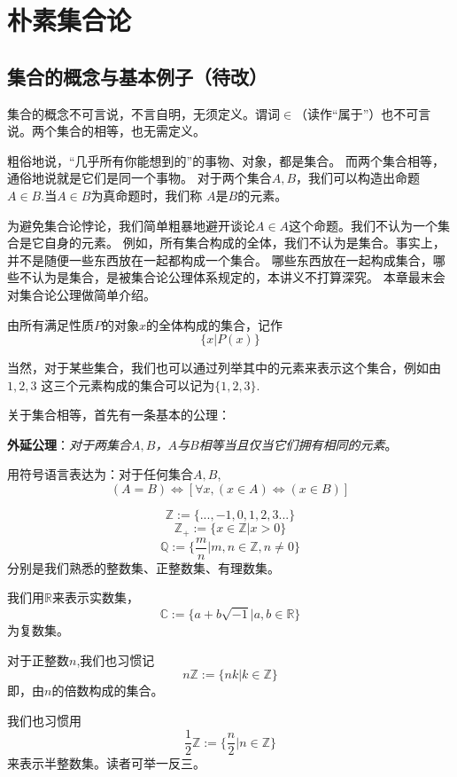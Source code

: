\section{朴素集合论}
\subsection{集合的概念与基本例子（待改）}
\begin{definition}
集合的概念不可言说，不言自明，无须定义。谓词$\in$（读作“属于”）也不可言说。两个集合的相等，也无需定义。
\end{definition}
粗俗地说，“几乎所有你能想到的”的事物、对象，都是集合。
而两个集合相等，通俗地说就是它们是同一个事物。
对于两个集合$A,B$，我们可以构造出命题$A\in B$.当$A\in B$为真命题时，我们称
$A$是$B$的元素。

为避免集合论悖论，我们简单粗暴地避开谈论$A\in A$这个命题。我们不认为一个集合是它自身的元素。
例如，所有集合构成的全体，我们不认为是集合。事实上，并不是随便一些东西放在一起都构成一个集合。
哪些东西放在一起构成集合，哪些不认为是集合，是被集合论公理体系规定的，本讲义不打算深究。
本章最末会对集合论公理做简单介绍。\vs

由所有满足性质$P$的对象$x$的全体构成的集合，记作
$$\{x|P(x)\}$$

当然，对于某些集合，我们也可以通过列举其中的元素来表示这个集合，例如由$1,2,3$
这三个元素构成的集合可以记为$\{1,2,3\}$.

关于集合相等，首先有一条基本的公理：\vs

\textbf{外延公理}：\emph{对于两集合$A,B$，$A$与$B$相等当且仅当它们拥有相同的元素}。

用符号语言表达为：对于任何集合$A,B$,
$$(A=B)\Leftrightarrow[\forall x,(x\in A)\Leftrightarrow(x\in B)]$$

\begin{example}[常见的集合及其记号]
$$\mathbb{Z}:=\{...,-1,0,1,2,3...\}$$
$$\mathbb{Z_+}:=\{x\in\mathbb{Z}|x>0\}$$
$$\mathbb{Q}:=\{\frac{m}{n}|m,n\in\mathbb{Z},n\neq0\}$$
分别是我们熟悉的整数集、正整数集、有理数集。
\end{example}
我们用$\mathbb{R}$来表示实数集，
$$\mathbb{C}:=\{a+b\sqrt{-1}|a,b\in\mathbb{R}\}$$
为复数集。

\begin{example}对于正整数$n$,我们也习惯记
$$n\mathbb{Z}:=\{nk|k\in\mathbb{Z}\}$$
即，由$n$的倍数构成的集合。
\end{example}

我们也习惯用
$$\frac{1}{2}\mathbb{Z}:=\{\frac{n}{2}|n\in\mathbb{Z}\}$$
来表示半整数集。读者可举一反三。

